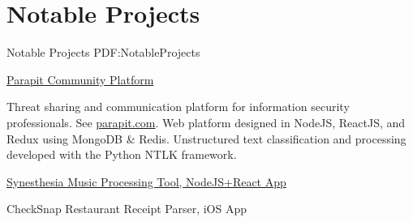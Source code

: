 
\section
{Notable Projects}
{Notable Projects}
{PDF:NotableProjects}

\BulletItem
\href{http://parapit.com}
{Parapit Community Platform}
\hfill
{}
\begin{detail}
\SubBulletItem
Threat sharing and communication platform for information security professionals. See \href{http://parapit.com}{parapit.com}.
\SubBulletItem
Web platform designed in NodeJS, ReactJS, and Redux using MongoDB \& Redis. Unstructured text classification and processing developed with the Python NTLK framework. 
\end{detail}

\GapNoBreak
\BulletItem
\href{https://github.com/bekher/synesthesia}
{Synesthesia Music Processing Tool, NodeJS+React App}
\hfill
{}

\GapNoBreak
\BulletItem
CheckSnap Restaurant Receipt Parser, iOS App
\hfill
{}

